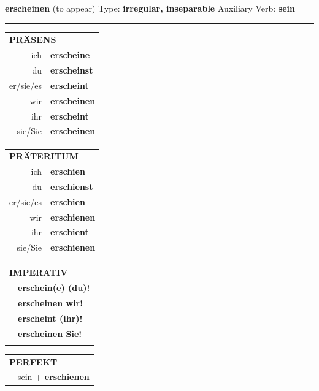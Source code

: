 \documentclass[10pt,a4paper]{revtex4-2}
\begin{document}
\begin{verbbox-dat}
    {\Large \bf erscheinen} (to appear) \hfill Type: \textbf{irregular, inseparable} \hfill Auxiliary Verb: \textbf{sein} 
    
     \vspace{5pt}

    \hrule
    
    \vspace{5pt}

  \begin{tabular}{rl}
     \multicolumn{2}{l}{\textbf{PRÄSENS} }\\
    ich & \textbf{erscheine}\\
    du & \textbf{erscheinst}\\
    er/sie/es & \textbf{erscheint}\\
    wir & \textbf{erscheinen}\\
    ihr & \textbf{erscheint}\\
    sie/Sie & \textbf{erscheinen}\\
  \end{tabular}
  \hfill
     \begin{tabular}{rl}
    \multicolumn{2}{l}{\textbf{PRÄTERITUM} }\\
    ich & \textbf{erschien}\\
    du & \textbf{erschienst}\\
    er/sie/es & \textbf{erschien}\\
    wir & \textbf{erschienen}\\
    ihr & \textbf{erschient}\\
    sie/Sie & \textbf{erschienen}\\
  \end{tabular}
  \hfill
  \begin{tabular}{rl}
     \multicolumn{2}{l}{\textbf{IMPERATIV} }\\
   & \textbf{erschein(e) (du)!}\\
   & \textbf{erscheinen wir!}\\
   & \textbf{erscheint (ihr)!}\\
   & \textbf{erscheinen Sie!}\\
   & \vspace{10pt}
  \end{tabular}

    \vspace{10pt}

 \begin{tabular}{rl}
     \multicolumn{2}{l}{\textbf{PERFEKT}}\\
   & sein + \textbf{erschienen}\\
  \end{tabular}
\hfill
   \begin{tabular}{rl}
   

\end{tabular}
\end{verbbox-dat}
\end{document}
